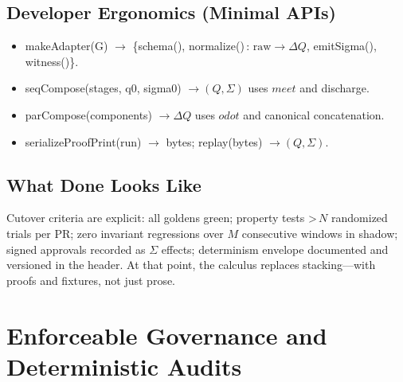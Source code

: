 \documentclass[11pt]{article}
\theoremstyle{plain}
\theoremstyle{definition}
\theoremstyle{remark}
\def\Q{Q}%
\def\Sig{\Sigma}%
\def\vmeet{meet}%
\def\hplus{odot}%
\def\code#1{#1}%
\DeclareRobustCommand{\Q}{\texorpdfstring{\ensuremath{\mathcal{Q}}}{Q}}     %
\DeclareRobustCommand{\Sig}{\texorpdfstring{\ensuremath{\Sigma}}{\Sigma}}   %
\newcommand{\vmeet}{\wedge}                    %
\newcommand{\hplus}{\odot}                     %
\newcommand{\code}[1]{\texttt{\textup{#1}}}    %
\def\Q{Q}%
\def\Sig{\Sigma}%
\def\vmeet{meet}%
\def\hplus{odot}%
\def\code#1{#1}%
\begin{document}
\subsection{Developer Ergonomics (Minimal APIs)}
\begin{itemize}[leftmargin=1.6em]
  \item \code{makeAdapter(G)} $\to$ \{\code{schema()}, \code{normalize()}\,$:\,\text{raw}\to\Delta\Q$, \code{emitSigma()}, \code{witness()}\}.
  \item \code{seqCompose(stages, q0, sigma0)} $\to (\Q,\Sig)$ uses $\vmeet$ and discharge.
  \item \code{parCompose(components)} $\to \Delta\Q$ uses $\hplus$ and canonical concatenation.
  \item \code{serializeProofPrint(run)} $\to$ bytes; \code{replay(bytes)} $\to (\Q,\Sig)$.
\end{itemize}

\subsection{What Done Looks Like}
Cutover criteria are explicit: all goldens green; property tests >\,$N$ randomized trials per PR; zero invariant regressions over $M$ consecutive windows in shadow; signed approvals recorded as $\Sig$ effects; determinism envelope documented and versioned in the header. At that point, the calculus replaces stacking—with proofs and fixtures, not just prose.


\section{Enforceable Governance and Deterministic Audits}
\label{sec:governance-audit}
\end{document}

